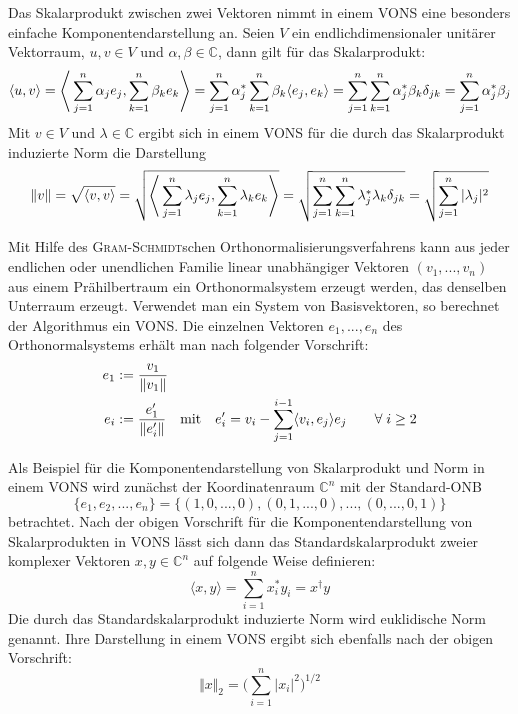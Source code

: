 \documentclass[9pt]{report}
\begin{document}
Das Skalarprodukt zwischen zwei Vektoren nimmt in einem VONS eine besonders einfache Komponentendarstellung an. Seien $V$ ein endlichdimensionaler unitärer Vektorraum, $u,v\in V$ und $\alpha,\beta\in\mathbb{C}$, dann gilt für das Skalarprodukt:
\begin{equation}
\langle u,v\rangle =\Bigg\langle\sum_{j=1}^{n}\alpha_j e_j,\sum_{k=1}^{n}\beta_k e_k\Bigg\rangle =\sum_{j=1}^{n}\alpha_{j}^{*}\sum_{k=1}^{n}\beta_{k}\langle e_j,e_k\rangle =\sum_{j=1}^{n}\sum_{k=1}^{n}\alpha_{j}^{*}\beta_{k}\delta_{jk}=\sum_{j=1}^{n}\alpha_{j}^{*}\beta_{j}\notag
\end{equation}
Mit $v\in V$ und $\lambda\in\mathbb{C}$ ergibt sich in einem VONS für die durch das Skalarprodukt induzierte Norm die Darstellung
\begin{equation}
\Vert v\Vert =\sqrt{\langle v,v\rangle}=\sqrt{\Bigg\langle\sum_{j=1}^{n}\lambda_j e_j,\sum_{k=1}^{n}\lambda_{k}e_k\Bigg\rangle}=\sqrt{\sum_{j=1}^{n}\sum_{k=1}^{n}\lambda_{j}^{*}\lambda_{k}\delta_{jk}}=\sqrt{\sum_{j=1}^{n}\vert\lambda_j\vert^{2}}\notag
\end{equation}

Mit Hilfe des \textsc{Gram-Schmidt}schen Orthonormalisierungsverfahrens kann aus jeder endlichen oder unendlichen Familie linear unabhängiger Vektoren $(v_1,...,v_n)$ aus einem Prähilbertraum ein Orthonormalsystem erzeugt werden, das denselben Unterraum erzeugt. Verwendet man ein System von Basisvektoren, so berechnet der Algorithmus ein VONS.
Die einzelnen Vektoren $e_1,...,e_n$ des Orthonormalsystems erhält man nach folgender Vorschrift:
\begin{align}
e_1 & :=\frac{v_1}{\Vert v_1\Vert}\notag\\
e_i & :=\frac{e_1'}{\Vert e_i'\Vert}\quad\mathrm{mit}\quad e_i'=v_i -\sum_{j=1}^{i-1}\langle v_i,e_j\rangle e_j\qquad\forall\;i\geq 2\notag
\end{align}

Als Beispiel für die Komponentendarstellung von Skalarprodukt und Norm in einem VONS wird  zunächst der Koordinatenraum $\mathbb{C}^n$ mit der Standard-ONB
\begin{equation}
\{e_1,e_2,...,e_n\}=\{(1,0,...,0),(0,1,...,0),...,(0,...,0,1)\}
\end{equation}
betrachtet. Nach der obigen Vorschrift für die Komponentendarstellung von Skalarprodukten in VONS lässt sich dann das Standardskalarprodukt zweier komplexer Vektoren $x,y\in\mathbb{C}^n$ auf folgende Weise definieren:
\begin{equation}
\langle x,y\rangle =\sum_{i=1}^{n}x_{i}^{*}y_i =x^{\dagger}y
\end{equation}
Die durch das Standardskalarprodukt induzierte Norm wird euklidische Norm genannt. Ihre Darstellung in einem VONS ergibt sich ebenfalls nach der obigen Vorschrift:
\begin{equation}
\Vert x\Vert_{2}=\Bigg(\sum_{i=1}^{n}\vert x_i\vert^{2}\Bigg)^{1/2}
\end{equation}
\end{document}
